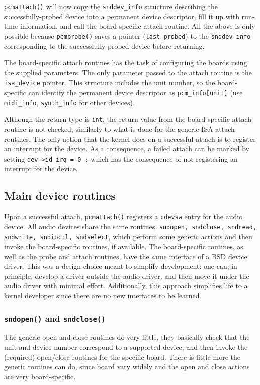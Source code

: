 \documentclass[11pt]{article}
\begin{document}
{\tt pcmattach()} will now copy the {\tt snddev\_info} structure
describing the successfully-probed device into a permanent device
descriptor, fill it up with run-time information, and call the
board-specific attach routine. All the above is only possible
because {\tt pcmprobe()} saves a pointer ({\tt last\_probed}) to
the {\tt snddev\_info} corresponding to the successfully probed
device before returning.

The board-specific attach routines has the task of configuring the
boards using the supplied parameters. The only parameter passed
to the attach routine is the {\tt isa\_device} pointer. This
structure includes the unit number, so the board-specific can
identify the permanent device descriptor as {\tt pcm\_info[unit]}
(use {\tt midi\_info}, {\tt synth\_info} for other devices).

Although the return type is {\tt int}, the return value from the
board-specific attach routine is not checked, similarly to what is
done for the generic ISA attach routines. The only action that the
kernel does on a successful attach is to register an interrupt for
the device. As a consequence, a failed attach can be marked by
setting {\tt dev->id\_irq = 0 ;} which has the consequence of not
registering an interrupt for the device.

\subsection{Main device routines}

Upon a successful attach, {\tt pcmattach()} registers a {\tt cdevsw}
entry for the audio device. All audio devices share the same routines,
{\tt sndopen, sndclose, sndread, sndwrite, sndioctl, sndselect},
which perform some generic actions and then invoke the board-specific
routines, if available. The board-specific routines, as well as
the probe and attach routines, have the same interface of a BSD
device driver. This was a design choice meant to simplify development:
one can, in principle, develop a driver outside the audio driver,
and then move it under the audio driver with minimal effort.
Additionally, this approach simplifies life to a kernel developer
since there are no new interfaces to be learned.

\subsubsection{{\tt sndopen()} and {\tt sndclose()} }

The generic open and close routines do very little, they basically
check that the unit and device number correspond to a supported
device, and then invoke the (required) open/close routines for
the specific board. There is little more the generic routines can
do, since board vary widely and the open and close actions are very
board-specific.
\end{document}
